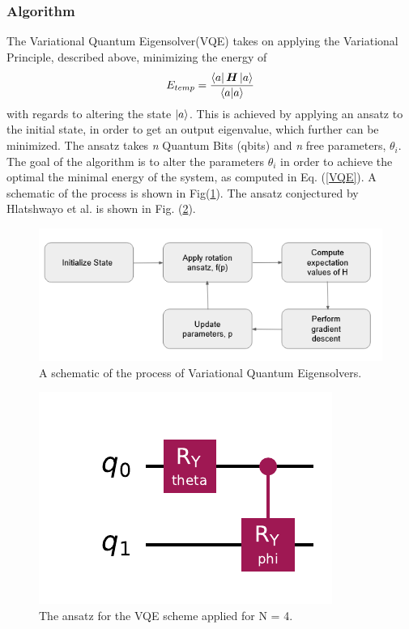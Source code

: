 \subsubsection{Algorithm}
The Variational Quantum Eigensolver(VQE) takes on applying the Variational Principle, described above, minimizing the energy of 
\begin{equation}\label{VQE}
    E_{temp} = \frac{\bra{a}\boldsymbol{H}\ket{a}}{\braket{a}}
\end{equation}
with regards to altering the state $\ket{a}$. This is achieved by applying an ansatz to the initial state, in order to get an output eigenvalue, which further can be minimized. The ansatz takes \textit{n} Quantum Bits (qbits) and \textit{n} free parameters, $\theta_i$. The goal of the algorithm is to alter the parameters $\theta_i$ in order to achieve the optimal the minimal energy of the system, as computed in Eq. (\ref{VQE}). A schematic of the process is shown in Fig(\ref{fig:VQE_scheme}). The ansatz conjectured by Hlatshwayo et al. \cite{} is shown in Fig. (\ref{fig:ansatz}). \begin{figure}
    \centering
    \includegraphics[width=\linewidth]{figs/VQE.PNG}
    \caption{A schematic of the process of Variational Quantum Eigensolvers.}
    \label{fig:VQE_scheme}
\end{figure}
\begin{figure}
    \centering
    \includegraphics[width=\linewidth]{figs/ansatz.pdf}
    \caption{The ansatz for the VQE scheme applied for N = 4. }
    \label{fig:ansatz}
\end{figure}


